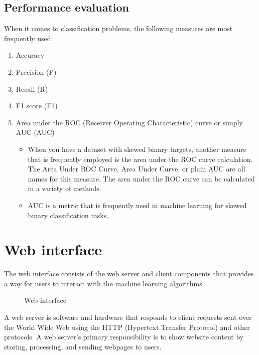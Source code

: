 
\subsection{Performance evaluation}
When it comes to classification problems, the following measures are most frequently used:

\begin{enumerate}[label=(\alph*)]
	\item{Accuracy}
	\item{Precision (P)}
	\item{Recall (R)}
	\item{F1 score (F1)}
	\item{Area under the ROC (Receiver Operating Characteristic) curve or simply AUC (AUC)
		\begin{itemize}
			\item {When you have a dataset with skewed binary targets, another measure that is frequently employed is the area under the ROC curve calculation. The Area Under ROC Curve, Area Under Curve, or plain AUC are all names for this measure. The area under the ROC curve can be calculated in a variety of methods.}
			\item{AUC is a metric that is frequently used in machine learning for skewed binary classification tasks.}
		\end{itemize}
	}
\end{enumerate}

\section{Web interface}
The web interface consists of the web server and client components that provides a way for users to interact with the machine learning algorithms.

\begin{figure}[htb]
\centering
{}
\caption{Web interface}
\label{fig:web-interface}
\end{figure}

A web server is software and hardware that responds to client requests sent over the World Wide Web using the HTTP (Hypertext Transfer Protocol) and other protocols. A web server's primary responsibility is to show website content by storing, processing, and sending webpages to users.

